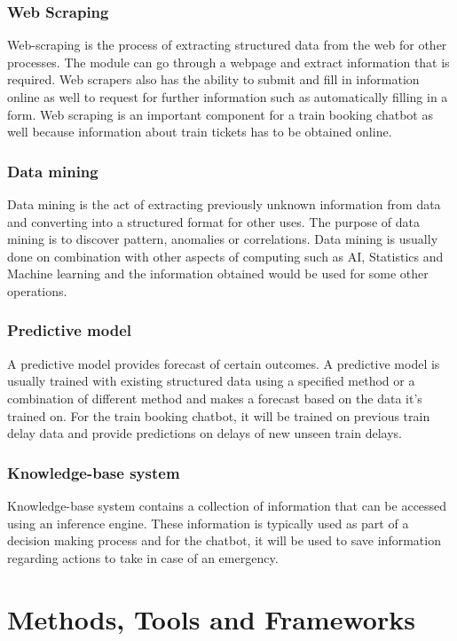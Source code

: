 \documentclass[11pt]{article}
\begin{document}
\subsubsection{Web Scraping}
Web-scraping is the process of extracting structured data from the web for other processes. The module can go through a webpage and extract information that is required. Web scrapers also has the ability to submit and fill in information online as well to request for further information such as automatically filling in a form. Web scraping is an important component for a train booking chatbot as well because information about train tickets has to be obtained online.

\subsubsection{Data mining}
Data mining is the act of extracting previously unknown information from data and converting into a structured format for other uses. The purpose of data mining is to discover pattern, anomalies or correlations. Data mining is usually done on combination with other aspects of computing such as AI, Statistics and Machine learning and the information obtained would be used for some other operations.

\subsubsection{Predictive model}
A predictive model provides forecast of certain outcomes. A predictive model is usually trained with existing structured data using a specified method or a combination of different method and makes a forecast based on the data it's trained on. For the train booking chatbot, it will be trained on previous train delay data and provide predictions on delays of new unseen train delays. 

\subsubsection{Knowledge-base system}
Knowledge-base system contains a collection of information that can be accessed using an inference engine. These information is typically used as part of a decision making process and for the chatbot, it will be used to save information regarding actions to take in case of an emergency.

\section{Methods, Tools and Frameworks}
\end{document}
